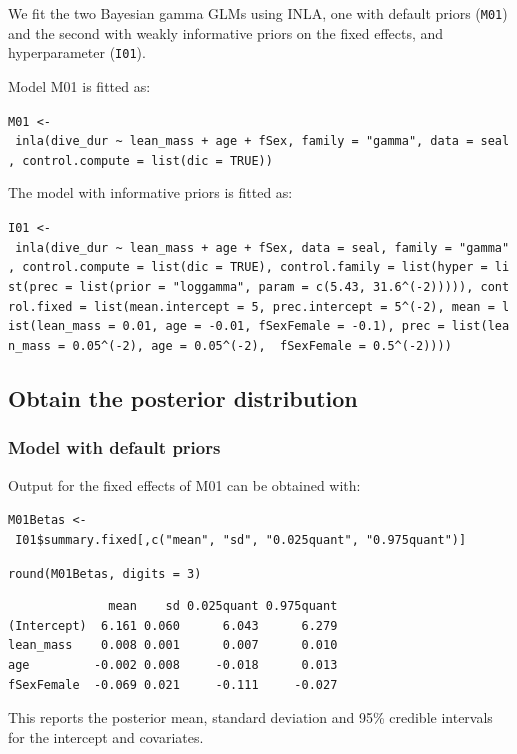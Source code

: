 \documentclass[
]{book}
\begin{document}
We fit the two Bayesian gamma GLMs using INLA, one with default priors (\texttt{M01}) and the second with weakly informative priors on the fixed effects, and hyperparameter (\texttt{I01}).

Model M01 is fitted as:

\texttt{M01\ \textless{}-\ inla(dive\_dur\ \textasciitilde{}\ lean\_mass\ +\ age\ +\ fSex,\ family\ =\ "gamma",\ data\ =\ seal,\ control.compute\ =\ list(dic\ =\ TRUE))}

The model with informative priors is fitted as:

\texttt{I01\ \textless{}-\ inla(dive\_dur\ \textasciitilde{}\ lean\_mass\ +\ age\ +\ fSex,\ data\ =\ seal,\ family\ =\ "gamma",\ control.compute\ =\ list(dic\ =\ TRUE),\ control.family\ =\ list(hyper\ =\ list(prec\ =\ list(prior\ =\ "loggamma",\ param\ =\ c(5.43,\ 31.6\^{}(-2))))),\ control.fixed\ =\ list(mean.intercept\ =\ 5,\ prec.intercept\ =\ 5\^{}(-2),\ mean\ =\ list(lean\_mass\ =\ 0.01,\ age\ =\ -0.01,\ fSexFemale\ =\ -0.1),\ prec\ =\ list(lean\_mass\ =\ 0.05\^{}(-2),\ age\ =\ 0.05\^{}(-2),\ \ fSexFemale\ =\ 0.5\^{}(-2))))}

\hypertarget{gamma-post-dist}{%
\subsection{Obtain the posterior distribution}\label{gamma-post-dist}}

\hypertarget{gamma-def-priors}{%
\subsubsection{Model with default priors}\label{gamma-def-priors}}

Output for the fixed effects of M01 can be obtained with:

\texttt{M01Betas\ \textless{}-\ I01\$summary.fixed{[},c("mean",\ "sd",\ "0.025quant",\ "0.975quant"){]}}

\texttt{round(M01Betas,\ digits\ =\ 3)}

\begin{verbatim}
              mean    sd 0.025quant 0.975quant
(Intercept)  6.161 0.060      6.043      6.279
lean_mass    0.008 0.001      0.007      0.010
age         -0.002 0.008     -0.018      0.013
fSexFemale  -0.069 0.021     -0.111     -0.027
\end{verbatim}

This reports the posterior mean, standard deviation and 95\% credible intervals for the intercept and covariates.
\end{document}
